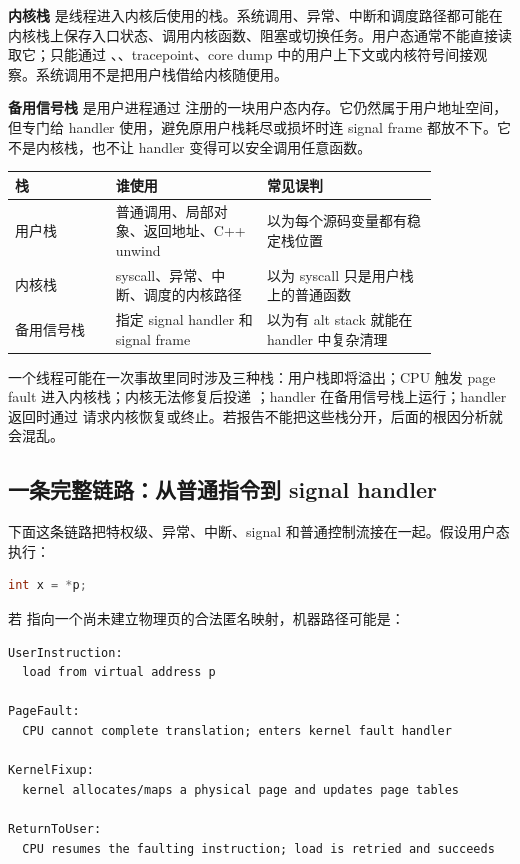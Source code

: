 \textbf{内核栈} 是线程进入内核后使用的栈。系统调用、异常、中断和调度路径都可能在内核栈上保存入口状态、调用内核函数、阻塞或切换任务。用户态通常不能直接读取它；只能通过 、、tracepoint、core dump 中的用户上下文或内核符号间接观察。系统调用不是把用户栈借给内核随便用。

\textbf{备用信号栈} 是用户进程通过  注册的一块用户态内存。它仍然属于用户地址空间，但专门给  handler 使用，避免原用户栈耗尽或损坏时连 signal frame 都放不下。它不是内核栈，也不让 handler 变得可以安全调用任意函数。

\begin{center}
\small
\begin{tabular}{p{0.20\linewidth}p{0.30\linewidth}p{0.34\linewidth}}
\toprule
栈 & 谁使用 & 常见误判 \\
\midrule
用户栈 & 普通调用、局部对象、返回地址、C++ unwind & 以为每个源码变量都有稳定栈位置 \\
内核栈 & syscall、异常、中断、调度的内核路径 & 以为 syscall 只是用户栈上的普通函数 \\
备用信号栈 & 指定 signal handler 和 signal frame & 以为有 alt stack 就能在 handler 中复杂清理 \\
\bottomrule
\end{tabular}
\end{center}

一个线程可能在一次事故里同时涉及三种栈：用户栈即将溢出；CPU 触发 page fault 进入内核栈；内核无法修复后投递 ；handler 在备用信号栈上运行；handler 返回时通过  请求内核恢复或终止。若报告不能把这些栈分开，后面的根因分析就会混乱。

\subsection{一条完整链路：从普通指令到 signal handler}

下面这条链路把特权级、异常、中断、signal 和普通控制流接在一起。假设用户态执行：

\begin{lstlisting}[language=C++]
int x = *p;
\end{lstlisting}

若  指向一个尚未建立物理页的合法匿名映射，机器路径可能是：

\begin{lstlisting}[numbers=none,caption={合法 minor fault 后恢复同一条指令}]
UserInstruction:
  load from virtual address p

PageFault:
  CPU cannot complete translation; enters kernel fault handler

KernelFixup:
  kernel allocates/maps a physical page and updates page tables

ReturnToUser:
  CPU resumes the faulting instruction; load is retried and succeeds
\end{lstlisting}

